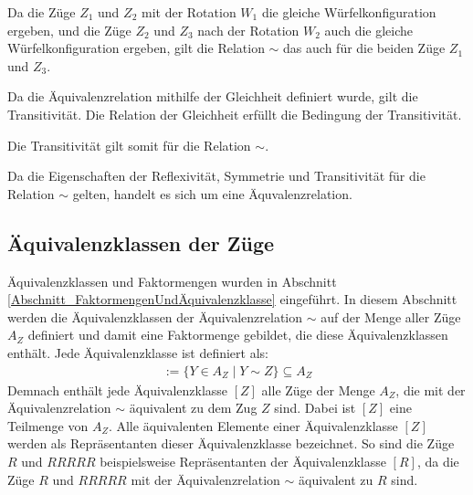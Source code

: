 \documentclass[12pt,a4paper, usenames, dvipsnames]{article}
\theoremstyle{mystyle}
\theoremstyle{definition}
\begin{document}
\begin{description}
Da die Züge $Z_1$ und $Z_2$ mit der Rotation $W_1$ die gleiche Würfelkonfiguration ergeben, und die Züge $Z_2$ und $Z_3$ nach der Rotation $W_2$ auch die gleiche Würfelkonfiguration ergeben, gilt die Relation $\sim$ das auch für die beiden Züge $Z_1$ und $Z_3$.

Da die Äquivalenzrelation mithilfe der Gleichheit definiert wurde, gilt die Transitivität. Die Relation der Gleichheit erfüllt die Bedingung der Transitivität.


Die Transitivität gilt somit für die Relation $\sim$.

\end{description}

Da die Eigenschaften der Reflexivität, Symmetrie und Transitivität für die Relation $\sim$ gelten, handelt es sich um eine Äquvalenzrelation.




%
%
%
%
%
%
%
%
%
%
%
%
%
%
%
%
%
%
%
%


\subsection{Äquivalenzklassen der Züge} 

\label{Abschnitt_ÄquivalenzklassenDerZüge}

Äquivalenzklassen und Faktormengen wurden in Abschnitt \ref{Abschnitt_FaktormengenUndÄquivalenzklasse} eingeführt. In diesem Abschnitt werden die Äquivalenzklassen der Äquivalenzrelation $\sim$ auf der Menge aller Züge $A_Z$ definiert und damit eine Faktormenge gebildet, die diese Äquivalenzklassen enthält. Jede Äquivalenzklasse ist definiert als:
\begin{align*}
[Z] := \{ Y \in A_Z \mid Y \sim Z \} \subseteq A_Z
\end{align*}
Demnach enthält jede Äquivalenzklasse $[Z]$ alle Züge der Menge $A_Z$, die mit der Äquivalenz\-relation $\sim$ äquivalent zu dem Zug $Z$ sind. Dabei ist $[Z]$ eine Teilmenge von $A_Z$.  Alle äquivalenten Elemente einer Äquivalenzklasse $[Z]$ werden als Repräsentanten dieser Äquivalenzklasse bezeichnet. So sind die Züge $R$ und $RRRRR$ beispielsweise Repräsentanten der Äquivalenzklasse $[R]$, da die Züge $R$ und $RRRRR$ mit der Äquivalenz\-relation $\sim$ äquivalent zu $R$ sind.
\end{document}
